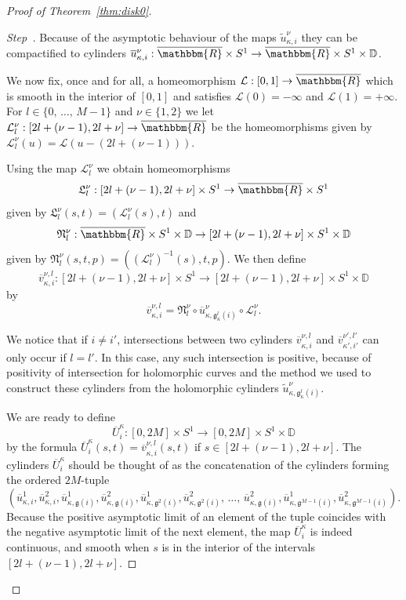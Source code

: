 \documentclass[AHL,Unicode,longabstracts,published]{cedram}
\newcommand{\R}{\mathbbm{R}}
\newcommand{\D}{\mathbb{D}}
\newcommand{\clL}{\mathcal{L}}
\newcommand{\fkg}{\mathfrak{g}}
\newcommand{\fkL}{\mathfrak{L}}
\newcommand{\fkN}{\mathfrak{N}}
\newcounter{stepcount}
\newenvironment{step}{\refstepcounter{stepcount}\begin{proof}[Step~\thestepcount]}{\let\qed\relax\end{proof}}
\begin{document}
\begin{proof}[Proof of Theorem~\ref{thm:disk0}]
\begin{step}
Because of the asymptotic behaviour of the maps $\widetilde{u}^\nu_{\kappa,i}$ they can be compactified to cylinders $\overline{u}^\nu_{\kappa,i}: \overline{\R} \times S^1 \to \overline{\R} \times S^1 \times \D $.

We now fix, once and for all, a homeomorphism $\clL: [0,{1}] \to \overline{\R}$ which is smooth in the interior of $[0,1]$ and satisfies $\clL(0)= -\infty$ and $\clL(1)= +\infty$. For $l \in \{0,\,\ldots,\,M-1\}$ and $\nu \in \{1,2\}$ we let $\clL^\nu_l: [2l + (\nu-1),2l + \nu] \to \overline{\R}$ be the homeomorphisms given by $\clL^\nu_l(u)=\clL(u-(2l + (\nu -1)))$.



Using the map $\clL^\nu_l$ we obtain homeomorphisms
\[
{\fkL^\nu_l}: [2l + (\nu-1),2l + \nu] \times S^1 \to \overline{\R} \times S^1
\]
given by ${\fkL^\nu_l}(s,t) = ({\clL^\nu_l}(s),t)$ and
\[
{\fkN^\nu_l}: \overline{\R} \times S^1 \times \D \to [2l + (\nu-1),2l + \nu] \times S^1 \times \D
\]
given by $\fkN^\nu_l(s,t,p) = ((\clL^\nu_l)^{-1}(s),t,p)$.
We then define
\[
\overline{v}^{\nu,l}_{\kappa,i}: [2l + (\nu-1),2l + \nu] \times S^1 \to [2l + (\nu-1),2l + \nu] \times S^1 \times \D
\]
by
\[
\overline{v}^{\nu,l}_{\kappa,i} = \fkN^\nu_l \circ \overline{u}^\nu_{\kappa,\fkg^l_\kappa(i)} \circ {\clL^\nu_l}.
\]

We notice that if $i\neq i'$, intersections between two cylinders $\overline{v}^{\nu,l}_{\kappa,i}$ and $\overline{v}^{\nu',l'}_{\kappa',i'}$ can only occur if $l=l'$. In this case, any such intersection is positive, because of positivity of intersection for holomorphic curves and the method we used to construct these cylinders from the holomorphic cylinders $\widetilde{u}^\nu_{\kappa,\fkg^l_\kappa(i)} $.

We are ready to define
\[
\overline{U}^\kappa_i: [0,2M] \times S^1 \to [0,2M] \times S^1 \times \D
\]
by the formula $\overline{U}^\kappa_i(s,t)= \overline{v}^{\nu,l}_{\kappa,i}(s,t)$ if $s \in [2l + (\nu-1),2l + \nu]$. The cylinders $\overline{U}^\kappa_i$ should be thought of as the concatenation of the cylinders forming the ordered $2M$-tuple
\[
\left(\overline{u}^1_{\kappa,i},\overline{u}^2_{\kappa,i}, \overline{u}^1_{\kappa,\fkg(i)},\overline{u}^2_{\kappa,\fkg(i)},\overline{u}^1_{\kappa,\fkg^2(i)},\overline{u}^2_{\kappa,\fkg^2(i)},\,\ldots,\,\overline{u}^2_{\kappa,\fkg(i)},\overline{u}^1_{\kappa,\fkg^{M-1}(i)},\overline{u}^2_{\kappa,\fkg^{M-1}(i)}\right).
\]
Because the positive asymptotic limit of an element of the tuple coincides with the negative asymptotic limit of the next element, the map
$\overline{U}^\kappa_i$ is indeed continuous, and smooth when $s$ is in the interior of the intervals $[2l + (\nu-1),2l + \nu]$.
\end{step}


\end{proof}
\end{document}
